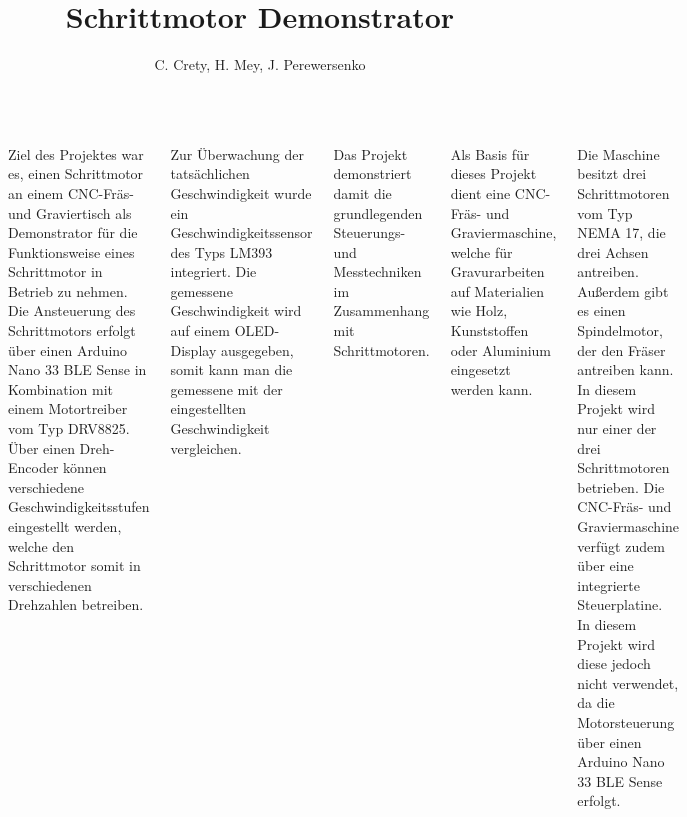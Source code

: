 \documentclass[25pt,a0paper, portrait]{tikzposter}
\title{Schrittmotor Demonstrator}
\author{C. Crety, H. Mey, J. Perewersenko}
\begin{document}
 
\maketitle

\begin{columns} 
	
	{
		{
			Ziel des Projektes war es, einen Schrittmotor an einem CNC-Fräs- und Graviertisch als Demonstrator für die Funktionsweise eines Schrittmotor in Betrieb zu nehmen. Die Ansteuerung des Schrittmotors erfolgt über einen Arduino Nano 33 BLE Sense in Kombination mit einem Motortreiber vom Typ DRV8825. Über einen Dreh-Encoder können verschiedene Geschwindigkeitsstufen eingestellt werden, welche den Schrittmotor somit in verschiedenen Drehzahlen betreiben. 
			
			Zur Überwachung der tatsächlichen Geschwindigkeit wurde ein Geschwindigkeitssensor des Typs LM393 integriert. Die gemessene Geschwindigkeit wird auf einem OLED-Display ausgegeben, somit kann man die gemessene mit der eingestellten Geschwindigkeit vergleichen. 
			
			Das Projekt demonstriert damit die grundlegenden Steuerungs- und Messtechniken im Zusammenhang mit Schrittmotoren.
		}
		{
			Als Basis für dieses Projekt dient eine CNC-Fräs- und Graviermaschine, welche für Gravurarbeiten auf Materialien wie Holz, Kunststoffen oder Aluminium eingesetzt werden kann. 
			
			Die Maschine besitzt drei Schrittmotoren vom Typ NEMA 17, die drei Achsen antreiben. Außerdem gibt es einen Spindelmotor, der den Fräser antreiben kann. In diesem Projekt wird nur einer der drei Schrittmotoren betrieben. Die CNC-Fräs- und Graviermaschine verfügt zudem über eine integrierte Steuerplatine. In diesem Projekt wird diese jedoch nicht verwendet, da die Motorsteuerung über einen Arduino Nano 33 BLE Sense erfolgt.
		}
	}


	{
		{

}}
\end{columns}
\end{document}
